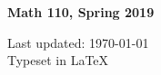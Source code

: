 \documentclass[12pt,letterpaper]{scrartcl}
\begin{document}
\centerline{\huge \textbf{Math 110, Spring 2019}} 
\vskip 0.6cm
\thispagestyle{empty}
\tableofcontents
\newpage
 \vfill
 \vfill
 \vfill
 \vfill
 \vfill
% 
\begin{center}
    Last updated: \today \\ Typeset in \LaTeX
\end{center}
\end{document}
